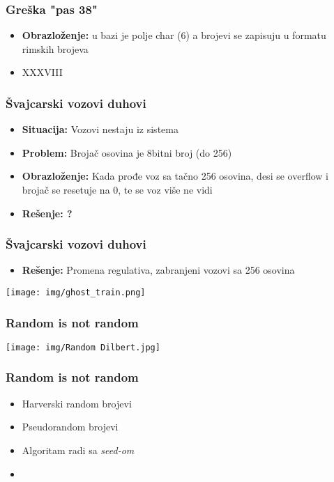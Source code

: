 \documentclass{beamer}
\begin{document}
\begin{frame}
    \frametitle{Greška "pas 38"}
    \begin{itemize}
        \item \textbf{Obrazloženje:} u bazi je polje char (6) a brojevi se zapisuju u formatu rimskih brojeva \newline
        \item XXXVIII
    \end{itemize}
\end{frame}

\begin{frame}
    \frametitle{Švajcarski vozovi duhovi}
    \begin{itemize}
        \item \textbf{Situacija:} Vozovi nestaju iz sistema \newline
        \item \textbf{Problem:} Brojač osovina je 8bitni broj (do 256) \newline
        \item \textbf{Obrazloženje:} Kada prođe voz sa tačno 256 osovina, desi se overflow i brojač se resetuje na 0, te se voz više ne vidi \newline
        \item \textbf{Rešenje: ?}
    \end{itemize}
\end{frame}

\begin{frame}
    \frametitle{Švajcarski vozovi duhovi}
    \begin{itemize}
        \item \textbf{Rešenje: } Promena regulativa, zabranjeni vozovi sa 256 osovina
    \end{itemize}
    \begin{center}
        \texttt{[image: img/ghost\_train.png]}
    \end{center}
\end{frame}

\begin{frame}
    \frametitle{Random is not random}
    \begin{center}
        \texttt{[image: img/Random Dilbert.jpg]}
    \end{center}
\end{frame}

\begin{frame}
    \frametitle{Random is not random}
    \begin{itemize}
        \item Harverski random brojevi \newline
        \item Pseudorandom brojevi \newline
        \item Algoritam radi sa \textit{seed-om} \newline
        \item 
    \end{itemize}
\end{frame}
\end{document}
